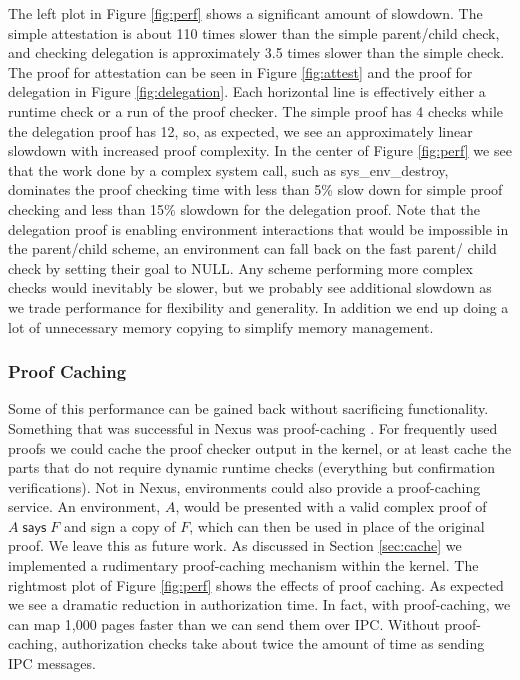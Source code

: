 \documentclass[10pt]{article}
\newcommand{\says}[2]{\ensuremath{#1\;\textsf{says}\;#2}}
\begin{document}
\newline\newline
The left plot in Figure \ref{fig:perf} shows a significant amount of slowdown.  The simple attestation is about 110 times slower than the simple parent/child check, and checking delegation is approximately 3.5 times slower than the simple check.  The proof for attestation can be seen in Figure \ref{fig:attest} and the proof for delegation in Figure \ref{fig:delegation}.  Each horizontal line is effectively either a runtime check or a run of the proof checker.  The simple proof has 4 checks while the delegation proof has 12, so, as expected, we see an approximately linear slowdown with increased proof complexity.  In the center of Figure \ref{fig:perf} we see that the work done by a complex system call, such as \textsf{sys\_env\_destroy}, dominates the proof checking time with less than 5\% slow down for simple proof checking and less than 15\% slowdown for the delegation proof.  Note that the delegation proof is enabling environment interactions that would be impossible in the parent/child scheme, an environment can fall back on the fast parent/ child check by setting their goal to \textsf{NULL}.  Any scheme performing more complex checks would inevitably be slower, but we probably see additional slowdown as we trade performance for flexibility and generality.  In addition we end up doing a lot of unnecessary memory copying to simplify memory management.
\subsubsection{Proof Caching}\label{sec:cacheperf}
Some of this performance can be gained back without sacrificing functionality.  Something that was successful in Nexus was proof-caching \cite{Nexus}.  For frequently used proofs we could cache the proof checker output in the kernel, or at least cache the parts that do not require dynamic runtime checks (everything but confirmation verifications).  Not in Nexus, environments could also provide a proof-caching service.  An environment, $A$, would be presented with a valid complex proof of $\says{A}{F}$ and sign a copy of $F$, which can then be used in place of the original proof.  We leave this as future work.
\newline\newline
As discussed in Section \ref{sec:cache} we implemented a rudimentary proof-caching mechanism within the kernel. The rightmost plot of Figure \ref{fig:perf} shows the effects of proof caching.  As expected we see a dramatic reduction in authorization time.  In fact, with proof-caching, we can map 1,000 pages faster than we can send them over IPC.  Without proof-caching, authorization checks take about twice the amount of time as sending IPC messages.
\end{document}
